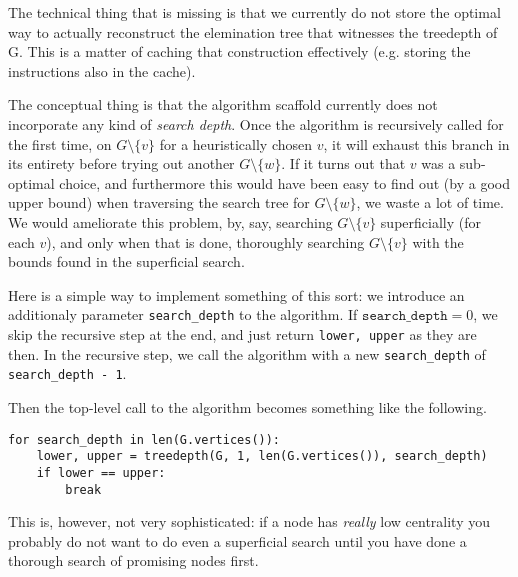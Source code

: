 \documentclass{article}
\theoremstyle{definition}
\begin{document}
The technical thing that is missing is that we currently do not store the
optimal way to actually reconstruct the elemination tree that witnesses the
treedepth of G. This is a matter of caching that construction effectively (e.g.
storing the instructions also in the cache).

The conceptual thing is that the algorithm scaffold currently does not
incorporate any kind of \emph{search depth}. Once the algorithm is recursively
called for the first time, on $G\setminus \{v\}$ for a heuristically chosen $v$,
it will exhaust this branch in its entirety before trying out another $G
\setminus \{w\}$. If it turns out that $v$ was a sub-optimal choice, and
furthermore this would have been easy to find out (by a good upper bound) when
traversing the search tree for $G \setminus \{w\}$, we waste a lot of time. We
would ameliorate this problem, by, say, searching $G \setminus \{v\}$
superficially (for each $v$), and only when that is done, thoroughly searching
$G \setminus \{v\}$ with the bounds found in the superficial search.

Here is a simple way to implement something of this sort: we introduce an
additionaly parameter \texttt{search\_depth} to the algorithm. If
$\mathtt{search\_depth} = 0$, we skip the recursive step at the end, and just
return \texttt{lower, upper} as they are then. In the recursive step, we call
the algorithm with a new \texttt{search\_depth} of \texttt{search\_depth - 1}.

Then the top-level call to the algorithm becomes something like the following.

\begin{verbatim}
for search_depth in len(G.vertices()):
    lower, upper = treedepth(G, 1, len(G.vertices()), search_depth)
    if lower == upper:
        break
\end{verbatim}

This is, however, not very sophisticated: if a node has \emph{really} low
centrality you probably do not want to do even a superficial search until you
have done a thorough search of promising nodes first.
\end{document}
